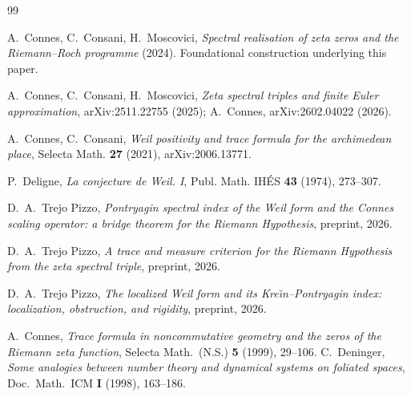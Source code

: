 \documentclass[11pt]{amsart}
\theoremstyle{definition}
\theoremstyle{remark}
\begin{document}
\begin{thebibliography}{99}

 A.~Connes, C.~Consani, H.~Moscovici,
\emph{Spectral realisation of zeta zeros and the Riemann--Roch programme}
(2024). Foundational construction underlying this paper.

 A.~Connes, C.~Consani, H.~Moscovici,
\emph{Zeta spectral triples and finite Euler approximation},
arXiv:2511.22755 (2025); A.~Connes, arXiv:2602.04022 (2026).

 A.~Connes, C.~Consani,
\emph{Weil positivity and trace formula for the archimedean place},
Selecta Math. \textbf{27} (2021), arXiv:2006.13771.

 P.~Deligne, \emph{La conjecture de Weil. I},
Publ. Math. IH\'ES \textbf{43} (1974), 273--307.

 D.~A.~Trejo Pizzo, \emph{Pontryagin spectral index of the Weil form and the Connes scaling operator: a bridge theorem for the Riemann Hypothesis}, preprint, 2026.

 D.~A.~Trejo Pizzo, \emph{A trace and measure criterion for the Riemann Hypothesis from the zeta spectral triple}, preprint, 2026.

 D.~A.~Trejo Pizzo, \emph{The localized Weil form and its Kre\u\i n--Pontryagin index: localization, obstruction, and rigidity}, preprint, 2026.

 A.~Connes, \emph{Trace formula in noncommutative geometry and the zeros of the Riemann zeta function}, Selecta Math.\ (N.S.) \textbf{5} (1999), 29--106.
 C.~Deninger, \emph{Some analogies between number theory and dynamical systems on foliated spaces}, Doc.\ Math.\ ICM \textbf{I} (1998), 163--186.
\end{thebibliography}
\end{document}
